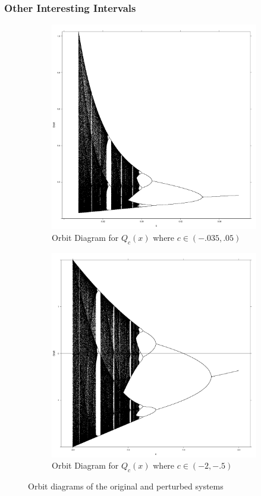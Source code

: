 \documentclass{beamer}
\newcommand{\<}{\left\langle}
\renewcommand{\>}{\right\rangle} %
\renewcommand{\*}{\cdot} %
\begin{document}
\begin{frame}
	\frametitle{Other Interesting Intervals}
	\begin{figure}[h]
	\centering
	\begin{subfigure}[b]{0.5\textwidth}
			\includegraphics[width=\textwidth]{./img/pertperdub}
			\caption{Orbit Diagram for $Q_c (x)$ where $c\in (-.035, .05)$}
	\end{subfigure}%
	\begin{subfigure}[b]{0.5\textwidth}
			\includegraphics[width=\textwidth]{./img/stdperdub}
			\caption{Orbit Diagram for $Q_c (x)$ where $c\in (-2, -.5)$}
	\end{subfigure}
	\caption{Orbit diagrams of the original and perturbed systems}\label{fig:perdub}
\end{figure}
\end{frame}
\end{document}
